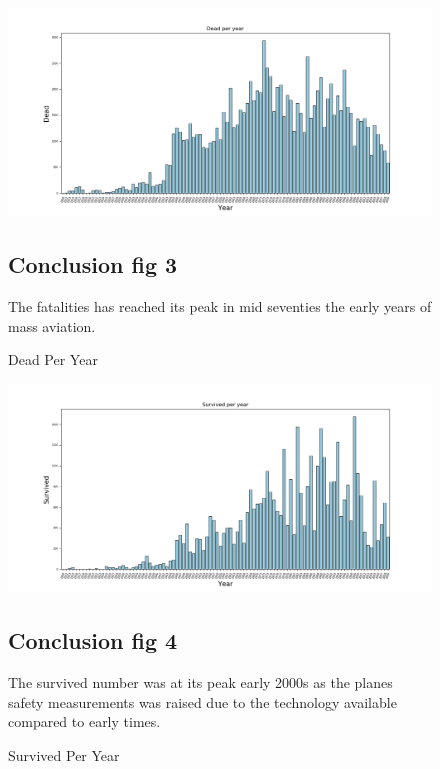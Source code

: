 \documentclass{article}
\begin{document}
\begin{figure}[!hbt]

\includegraphics[width=1.3\linewidth,height=0.500\textheight]{Dead_per_year.png}
\caption{Dead Per Year}
\label{fig3:}
\subsection{Conclusion fig 3}
The fatalities has reached its peak in mid seventies the early years of mass aviation.
\end{figure}

\begin{figure}[!hbt]
\includegraphics[width=1.3\linewidth,height=0.500\textheight]{Survived_per_year.png}
\caption{Survived Per Year}
\label{fig4:}
\subsection{Conclusion fig 4}
The survived number was at its peak early 2000s as the planes safety measurements was raised due to the technology available compared to early times.
\end{figure}
\end{document}

